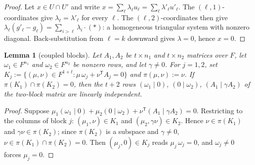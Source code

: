 \documentclass{article}
\newtheorem{lemma}[theorem]{Lemma}
\theoremstyle{definition}
\begin{document}
\begin{proof}
Let $x \in U \cap U'$ and write $x = \sum_\ell \lambda_\ell u_\ell = \sum_\ell \lambda'_\ell u'_\ell$. The $(\ell, 1)$-coordinates give $\lambda_\ell = \lambda'_\ell$ for every $\ell$. The $(\ell, 2)$-coordinates then give $\lambda_\ell (g'_\ell - g_\ell) = \sum_{i > \ell} \lambda_i \cdot (\ast)$: a homogeneous triangular system with nonzero diagonal. Back-substitution from $\ell = k$ downward gives $\lambda = 0$, hence $x = 0$.
\end{proof}

\begin{lemma}[coupled blocks]\label{lem:blockrank}
Let $A_1, A_2$ be $t \times n_1$ and $t \times n_2$ matrices over $F$, let $\omega_1 \in F^{n_1}$ and $\omega_2 \in F^{n_2}$ be nonzero rows, and let $\gamma \neq 0$. For $j = 1, 2$, set $K_j := \{(\mu, \nu) \in F^{1 + t} : \mu\, \omega_j + \nu^{\mathsf{T}} A_j = 0\}$ and $\pi(\mu, \nu) := \nu$. If $\pi(K_1) \cap \pi(K_2) = 0$, then the $t + 2$ rows $(\omega_1 \mid 0)$, $(0 \mid \omega_2)$, $(A_1 \mid \gamma A_2)$ of the two-block matrix are linearly independent.
\end{lemma}

\begin{proof}
Suppose $\mu_1 (\omega_1 \mid 0) + \mu_2 (0 \mid \omega_2) + \nu^{\mathsf{T}} (A_1 \mid \gamma A_2) = 0$. Restricting to the columns of block $j$: $(\mu_1, \nu) \in K_1$ and $(\mu_2, \gamma \nu) \in K_2$. Hence $\nu \in \pi(K_1)$ and $\gamma \nu \in \pi(K_2)$; since $\pi(K_2)$ is a subspace and $\gamma \neq 0$, $\nu \in \pi(K_1) \cap \pi(K_2) = 0$. Then $(\mu_j, 0) \in K_j$ reads $\mu_j\, \omega_j = 0$, and $\omega_j \neq 0$ forces $\mu_j = 0$.
\end{proof}
\end{document}
